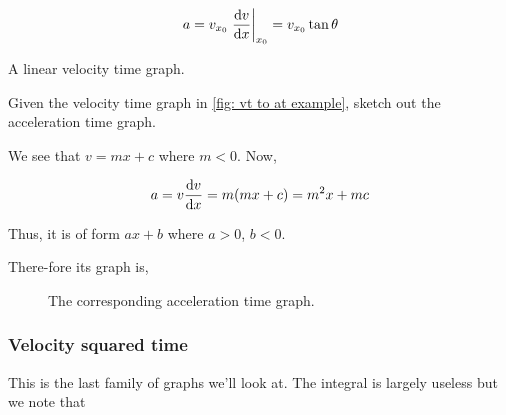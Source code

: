 \begin{equation*}
    a = v_{x_0} \eval{\dv{v}{x}}_{x_0} = v_{x_0} \tan\theta
\end{equation*}

\begin{marginfigure}
    \centering
    \caption{A linear velocity time graph.}
    \label{fig: vt to at example}
\end{marginfigure}

\begin{example}
    Given the velocity time graph in \cref{fig: vt to at example}, sketch out the acceleration time graph.
    \begin{soln}
        We see that \(v = mx + c\) where \(m < 0\). Now, 

        \begin{equation*}
            a = v \dv{v}{x} = m(mx + c) = m^2x + mc
        \end{equation*}

        Thus, it is of form \(ax + b\) where \(a > 0\), \(b < 0\).

        There-fore its graph is,
        
    \begin{figure}[H]
    \centering
        \caption{The corresponding acceleration time graph.}
    \end{figure}%
    \end{soln}
\end{example}

\subsubsection{Velocity squared time}

This is the last family of graphs we'll look at.
The integral is largely useless but we note that 

